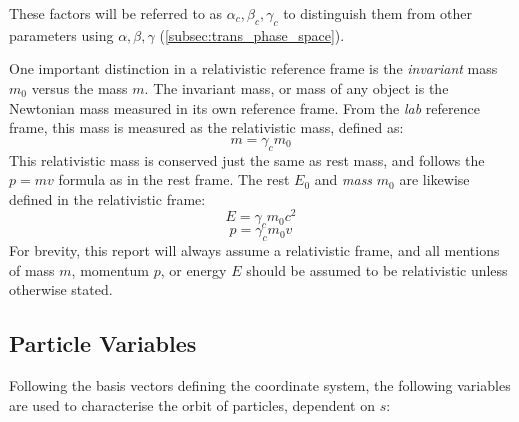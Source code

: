 \documentclass[a4paper,twoside,11pt]{report}
\begin{document}
These factors will be referred to as $\alpha_c, \beta_c, \gamma_c$ to distinguish them from other parameters using $\alpha, \beta, \gamma$ (\autoref{subsec:trans_phase_space}).

One important distinction in a relativistic reference frame is the \textit{invariant} mass $m_0$ versus the  mass $m$. The invariant mass, or  mass of any object is the Newtonian mass measured in its own reference frame. From the \textit{lab} reference frame, this mass is measured as the relativistic mass, defined as:
\begin{equation}
    m=\gamma_c m_0
\end{equation}
This relativistic mass is conserved just the same as rest mass, and follows the $p=mv$ formula as in the rest frame. 
The rest  $E_0$ and \textit{mass} $m_0$ are likewise defined in the relativistic frame:
\begin{equation}
    E=\gamma_c m_0c^2
    \label{eq:relativistic_energy}
\end{equation}
\begin{equation}
    p=\gamma_c m_0v
    \label{eq:relativistic_momentum}
\end{equation}
For brevity, this report will always assume a relativistic frame, and all mentions of mass $m$, momentum $p$, or energy $E$ should be assumed to be relativistic unless otherwise stated.

\subsection{Particle Variables}

Following the basis vectors defining the coordinate system, the following variables are used to characterise the orbit of particles, dependent on $s$:
\end{document}
